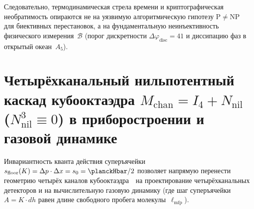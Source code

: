 Следовательно, термодинамическая стрела времени и криптографическая необратимость опираются не на уязвимую алгоритмическую гипотезу $\mathrm{P}\neq\mathrm{NP}$ для биективных перестановок, а на фундаментальную неинъективность физического измерения~$\mathcal{B}$ (порог дискретности $\Delta\varphi_{\mathrm{disc}}=41$ и диссипацию фаз в открытый океан~$A_5$).

\section{Четырёхканальный нильпотентный каскад кубооктаэдра \texorpdfstring{$M_{\mathrm{chan}} = I_4 + N_{\mathrm{nil}}$}{M\_chan = I\_4 + N\_nil} (\texorpdfstring{$N_{\mathrm{nil}}^3 \equiv 0$}{N\_nil\^3 = 0}) в приборостроении и газовой динамике}
\label{sec:compute-cuboctahedral-aperture-and-gas-dynamics}

Инвариантность кванта действия суперъячейки $s_{\mathrm{floor}}(K) = \Delta p\cdot\Delta x = s_0 = \planckHbar/2$ позволяет напрямую перенести геометрию четырёх каналов кубооктаэдра~\latGCKshort\ на проектирование четырёхканальных детекторов и на вычислительную газовую динамику (где шаг суперъячейки $A = K\cdot dh$ равен длине свободного пробега молекулы~$\ell_{\mathrm{mfp}}$).

